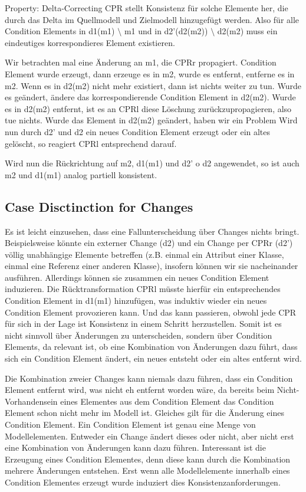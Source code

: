 Property: Delta-Correcting
CPR stellt Konsistenz für solche Elemente her, die durch das Delta im Quellmodell und Zielmodell hinzugefügt werden. Also für alle Condition Elements in d1(m1) $\setminus$ m1 und in d2'(d2(m2)) $\setminus$ d2(m2) muss ein eindeutiges korrespondieres Element existieren.



Wir betrachten mal eine Änderung an m1, die CPRr propagiert. Condition Element wurde erzeugt, dann erzeuge es in m2, wurde es entfernt, entferne es in m2. Wenn es in d2(m2) nicht mehr existiert, dann ist nichts weiter zu tun.
Wurde es geändert, ändere das korrespondierende Condition Element in d2(m2). Wurde es in d2(m2) entfernt, ist es an CPRl diese Löschung zurückzupropagieren, also tue nichts. Wurde das Element in d2(m2) geändert, haben wir ein Problem 
Wird nun durch d2' und d2 ein neues Condition Element erzeugt oder ein altes gelöscht, so reagiert CPRl entsprechend darauf.

Wird nun die Rückrichtung auf m2, d1(m1) und d2' o d2 angewendet, so ist auch m2 und d1(m1) analog partiell konsistent.




\subsection{Case Disctinction for Changes}
Es ist leicht einzusehen, dass eine Fallunterscheidung über Changes nichts bringt.
Beispielsweise könnte ein externer Change (d2) und ein Change per CPRr (d2') völlig unabhängige Elemente betreffen (z.B. einmal ein Attribut einer Klasse, einmal eine Referenz einer anderen Klasse), insofern können wir sie nacheinander ausführen. Allerdings können sie zusammen ein neues Condition Element induzieren. Die Rücktransformation CPRl müsste hierfür ein entsprechendes Condition Element in d1(m1) hinzufügen, was induktiv wieder ein neues Condition Element provozieren kann.
Und das kann passieren, obwohl jede CPR für sich in der Lage ist Konsistenz in einem Schritt herzustellen.
Somit ist es nicht sinnvoll über Änderungen zu unterscheiden, sondern über Condition Elements, da relevant ist, ob eine Kombination von Änderungen dazu führt, dass sich ein Condition Element ändert, ein neues entsteht oder ein altes entfernt wird.

Die Kombination zweier Changes kann niemals dazu führen, dass ein Condition Element entfernt wird, was nicht eh entfernt worden wäre, da bereits beim Nicht-Vorhandensein eines Elementes aus dem Condition Element das Condition Element schon nicht mehr im Modell ist.
Gleiches gilt für die Änderung eines Condition Element. Ein Condition Element ist genau eine Menge von Modellelementen. Entweder ein Change ändert dieses oder nicht, aber nicht erst eine Kombination von Änderungen kann dazu führen.
Interessant ist die Erzeugung eines Condition Elementes, denn diese kann durch die Kombination mehrere Änderungen entstehen. Erst wenn alle Modellelemente innerhalb eines Condition Elementes erzeugt wurde induziert dies Konsistenzanforderungen.



